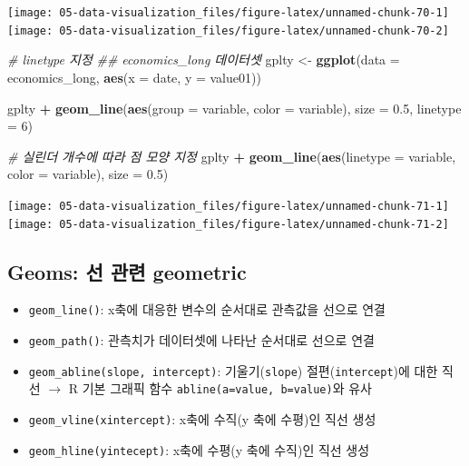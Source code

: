 \documentclass[
  11pt,
]{krantz}
\newenvironment{Shaded}{\begin{snugshade}}{\end{snugshade}}
\newcommand{\CommentTok}[1]{\textcolor[rgb]{0.37,0.37,0.37}{\textit{#1}}}
\newcommand{\DataTypeTok}[1]{\textcolor[rgb]{0.27,0.27,0.27}{#1}}
\newcommand{\DecValTok}[1]{\textcolor[rgb]{0.06,0.06,0.06}{#1}}
\newcommand{\FloatTok}[1]{\textcolor[rgb]{0.06,0.06,0.06}{#1}}
\newcommand{\KeywordTok}[1]{\textcolor[rgb]{0.27,0.27,0.27}{\textbf{#1}}}
\newcommand{\NormalTok}[1]{#1}
\newcommand{\OperatorTok}[1]{\textcolor[rgb]{0.43,0.43,0.43}{\textbf{#1}}}
\newcommand{\StringTok}[1]{\textcolor[rgb]{0.5,0.5,0.5}{#1}}
\providecommand{\tightlist}{%
  \setlength{\itemsep}{0pt}\setlength{\parskip}{0pt}}
\begin{document}
\texttt{[image: 05-data-visualization\_files/figure-latex/unnamed-chunk-70-1]} \texttt{[image: 05-data-visualization\_files/figure-latex/unnamed-chunk-70-2]}

\normalsize

\footnotesize

\begin{Shaded}
\begin{Highlighting}[]
\CommentTok{# linetype 지정}
\CommentTok{## economics_long 데이터셋}
\NormalTok{gplty <-}\StringTok{ }\KeywordTok{ggplot}\NormalTok{(}\DataTypeTok{data =}\NormalTok{ economics_long, }
                \KeywordTok{aes}\NormalTok{(}\DataTypeTok{x =}\NormalTok{ date, }\DataTypeTok{y =}\NormalTok{ value01))}

\NormalTok{gplty }\OperatorTok{+}\StringTok{ }
\StringTok{  }\KeywordTok{geom_line}\NormalTok{(}\KeywordTok{aes}\NormalTok{(}\DataTypeTok{group =}\NormalTok{ variable, }\DataTypeTok{color =}\NormalTok{ variable), }
            \DataTypeTok{size =} \FloatTok{0.5}\NormalTok{, }
            \DataTypeTok{linetype =} \DecValTok{6}\NormalTok{)}

\CommentTok{# 실린더 개수에 따라 점 모양 지정}
\NormalTok{gplty }\OperatorTok{+}\StringTok{ }
\StringTok{  }\KeywordTok{geom_line}\NormalTok{(}\KeywordTok{aes}\NormalTok{(}\DataTypeTok{linetype =}\NormalTok{ variable, }
                \DataTypeTok{color =}\NormalTok{ variable), }
            \DataTypeTok{size =} \FloatTok{0.5}\NormalTok{)}
\end{Highlighting}
\end{Shaded}

\texttt{[image: 05-data-visualization\_files/figure-latex/unnamed-chunk-71-1]} \texttt{[image: 05-data-visualization\_files/figure-latex/unnamed-chunk-71-2]}

\normalsize

\hypertarget{geom-lines}{%
\subsection{Geoms: 선 관련 geometric}\label{geom-lines}}

\begin{itemize}
\tightlist
\item
  \texttt{geom\_line()}: x축에 대응한 변수의 순서대로 관측값을 선으로 연결
\item
  \texttt{geom\_path()}: 관측치가 데이터셋에 나타난 순서대로 선으로 연결
\item
  \texttt{geom\_abline(slope,\ intercept)}: 기울기(\texttt{slope}) 절편(\texttt{intercept})에 대한 직선 \(\rightarrow\) R 기본 그래픽 함수 \texttt{abline(a=value,\ b=value)}와 유사
\item
  \texttt{geom\_vline(xintercept)}: x축에 수직(y 축에 수평)인 직선 생성
\item
  \texttt{geom\_hline(yintecept)}: x축에 수평(y 축에 수직)인 직선 생성
\end{itemize}
\end{document}
